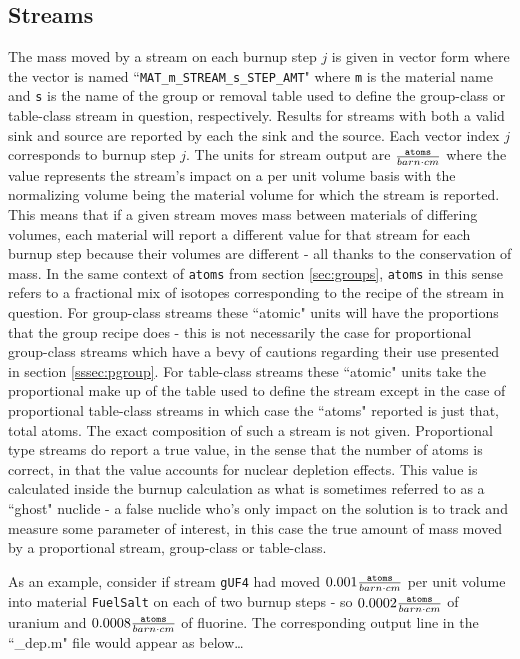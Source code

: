 \subsection{Streams}\label{ssec:output_streams}
The mass moved by a stream on each burnup step $j$ is given in vector form
where the vector is named ``\texttt{MAT\_m\_STREAM\_s\_STEP\_AMT}" where 
\texttt{m} is the material name and \texttt{s} is the name of the group or
removal table used to define the group-class or table-class stream in question,
respectively. Results for streams with both a valid sink and source are 
reported by each the sink and the source.
Each vector index $j$ corresponds to burnup step $j$. The units
for stream output are $\frac{\text{\texttt{atoms}}}{barn \cdot cm}$ where the 
value represents
the stream's impact on a per unit volume basis with the normalizing volume being
the material volume for which the stream is reported. This means that if a given
stream moves mass between materials of differing volumes, each material will
report a different value for that stream for each burnup step because their
volumes are different - all thanks to the conservation of mass. In the same
context of \texttt{atoms} from section \ref{sec:groups}, \texttt{atoms} in this
sense refers to a fractional mix of isotopes corresponding to the recipe of the
stream in question. For group-class streams these ``atomic" units will have
the proportions that the group recipe does - this is not necessarily the case
for proportional group-class streams which have a bevy of cautions regarding
their use presented in section \ref{sssec:pgroup}. For table-class streams these
``atomic" units take the proportional make up of the table used to define the
stream except in the case of proportional table-class streams in which case 
the ``atoms" reported is just that, total atoms. The exact composition of
such a stream is not given.
Proportional
type streams do report a true value, in the sense that the number of atoms is
correct, in that the value accounts for nuclear depletion effects.
This value is calculated inside the burnup calculation as what is sometimes
referred to as a ``ghost" nuclide - a false nuclide who's only impact on the
solution is to track and measure some parameter of interest, in this case the
true amount of mass moved by a proportional stream, group-class or table-class.

As an example, consider if stream \texttt{gUF4} had moved 
$0.001 \frac{\text{\texttt{atoms}}}{barn \cdot cm }$ per unit volume into 
material \texttt{FuelSalt} on each of two burnup steps - so  
$0.0002 \frac{\text{\texttt{atoms}}}{barn \cdot cm }$ of uranium and 
$0.0008 \frac{\text{\texttt{atoms}}}{barn \cdot cm }$ of fluorine. 
The corresponding output line in the ``\_dep.m" file would appear as below\ldots

